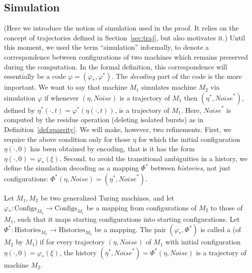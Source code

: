 \documentclass[11pt]{memoir}
\theoremstyle{definition} %
\newcommand{\Configs}{\mathrm{Configs}}
\newcommand{\Noise}{\mathit{Noise}}
\newcommand{\Histories}{\mathrm{Histories}}
\begin{document}
 \subsection{Simulation}\label{sec:sim}

 (Here we introduce the notion of simulation used in the proof.
 It relies on the concept of trajectories defined in Section~\ref{sec:traj},
 but also motivates it.)
Until this moment, we used the term ``simulation'' informally, to denote
a correspondence between configurations of
two machines which remains preserved during the computation.
In the formal definition, this correspondence will essentially be a code
\( \varphi=(\varphi_{*},\varphi^{*}) \).
The \emph{decoding} part of the code is the more important.
We want to say that machine \( M_{1} \) simulates machine \( M_{2} \) via
simulation \( \varphi \) if whenever \( (\eta, \Noise) \) is a trajectory of \( M_{1} \) 
then \( (\eta^{*},\Noise^{*}) \),
defined by \( \eta^{*}(\cdot,t)=\varphi^{*}(\eta(\cdot,t)) \), is a
trajectory of \( M_{1} \).
Here, \( \Noise^{*} \) is computed by the residue operation (deleting isolated bursts)
as in Definition~\ref{def:sparsity}.
We will make, however, two refinements.
First, we require the above condition only for
those \( \eta \) for which the initial configuration
 \( \eta(\cdot,0) \) has been obtained by encoding, that is it has the form 
\( \eta(\cdot,0)=\varphi_{*}(\xi) \).
Second, to avoid the transitional ambiguities in a history,
we define the simulation decoding as a mapping \( \Phi^{*} \)
between \emph{histories}, not just configurations:
\( \Phi^{*}(\eta,\Noise)=(\eta^{*},\Noise^{*}) \).

\begin{sloppypar}
\begin{definition}[Simulation] \label{def:simulation-central}
  Let \( M_{1},M_{2} \) be two generalized Turing machines, and let
  \( 
    \varphi_{*}:\Configs_{M_{2}} \to \Configs_{M_{1}} \)
be a mapping from configurations of \( M_{2} \) to those of \( M_{1} \), such that it maps
starting configurations into starting configurations.
Let \(    \Phi^{*}:\Histories_{M_{1}} \to \Histories_{M_{2}} \) be a mapping.
The pair \( (\varphi_{*}, \Phi^{*})  \)
is called a  (of \(  M_{2}  \) by \(  M_{1}  \)) if for every
trajectory \(  (\eta, \Noise)  \) of \( M_{1} \) with initial
configuration \(  \eta(\cdot,0)=\varphi_{*}(\xi)  \),
the history \(  (\eta^{*},\Noise^{*})=\Phi^{*}(\eta,\Noise)  \) is
a trajectory of machine \(  M_{2}  \).
\end{definition}
  \end{sloppypar}
\end{document}

